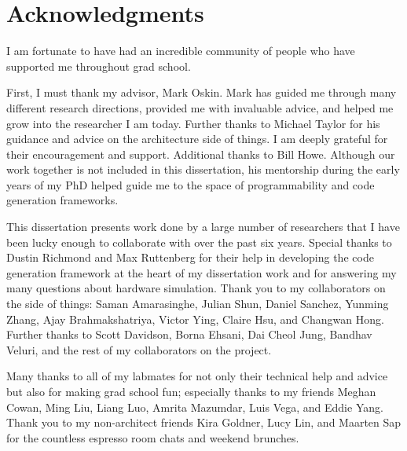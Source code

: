 
\bigskip

\begingroup
\let\clearpage\relax
\let\cleardoublepage\relax
\let\cleardoublepage\relax
\chapter*{Acknowledgments}



I am fortunate to have had an incredible community of people who have supported me throughout grad school. %

First, I must thank my advisor, Mark Oskin.
Mark has guided me through many different research directions, provided me with invaluable advice, and helped me grow into the researcher I am today.
Further thanks to Michael Taylor for his guidance and advice on the architecture side of things.
I am deeply grateful for their encouragement and support. 
Additional thanks to Bill Howe.
Although our work together is not included in this dissertation, his mentorship during the early years of my PhD helped guide me to the space of programmability and code generation frameworks.

This dissertation presents work done by a large number of researchers that I have been lucky enough to collaborate with over the past six years.
Special thanks to Dustin Richmond and Max Ruttenberg for their help in developing the code generation framework at the heart of my dissertation work and for answering my many questions about hardware simulation.
Thank you to my collaborators on the \graphit side of things: Saman Amarasinghe, Julian Shun, Daniel Sanchez, Yunming Zhang, Ajay Brahmakshatriya, Victor Ying, Claire Hsu, and Changwan Hong.
Further thanks to Scott Davidson, Borna Ehsani, Dai Cheol Jung, Bandhav Veluri, and the rest of my collaborators on the \hb project. 

Many thanks to all of my labmates for not only their technical help and advice but also for making grad school fun; 
especially thanks to my friends Meghan Cowan, Ming Liu, Liang Luo, Amrita Mazumdar, Luis Vega, and Eddie Yang.
Thank you to my non-architect friends Kira Goldner, Lucy Lin, and Maarten Sap for the countless espresso room chats and weekend brunches.

